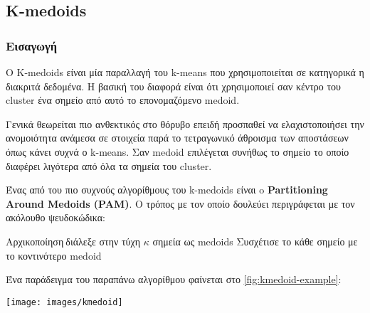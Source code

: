 \subsection{Κ-medoids}

\subsubsection{Εισαγωγή}
Ο K-medoids είναι μία παραλλαγή του k-means που χρησιμοποιείται σε κατηγορικά η διακριτά δεδομένα.
Η βασική του διαφορά είναι ότι χρησιμοποιεί σαν κέντρο του cluster ένα σημείο από αυτό το επονομαζόμενο medoid.

Γενικά θεωρείται πιο ανθεκτικός στο θόρυβο επειδή προσπαθεί να ελαχιστοποιήσει την ανομοιότητα ανάμεσα σε στοιχεία παρά το τετραγωνικό άθροισμα των αποστάσεων όπως κάνει συχνά ο k-means.
Σαν medoid επιλέγεται συνήθως το σημείο το οποίο διαφέρει λιγότερα από όλα τα σημεία του cluster.

Ένας από του πιο συχνούς αλγορίθμους του k-medoids είναι o \textbf{Partitioning Around Medoids (PAM)}.
Ο τρόπος με τον οποίο δουλεύει
περιγράφεται με τον ακόλουθο ψευδοκώδικα:\\
\begin{algorithm}[H]
    Αρχικοποίηση$\:$διάλεξε στην τύχη $\kappa$ σημεία ως medoids\;
    Συσχέτισε το κάθε σημείο με το κοντινότερο medoid\;
\end{algorithm}

Ένα παράδειγμα του παραπάνω αλγορίθμου φαίνεται στο 
\hyperref[fig:kmedoid-example]{\figurename{} \ref{fig:kmedoid-example}}:

\noindent\begin{minipage}{\linewidth}
    \centering
	\texttt{[image: images/kmedoid]}
	\label{fig:kmedoid-example}
\end{minipage}

